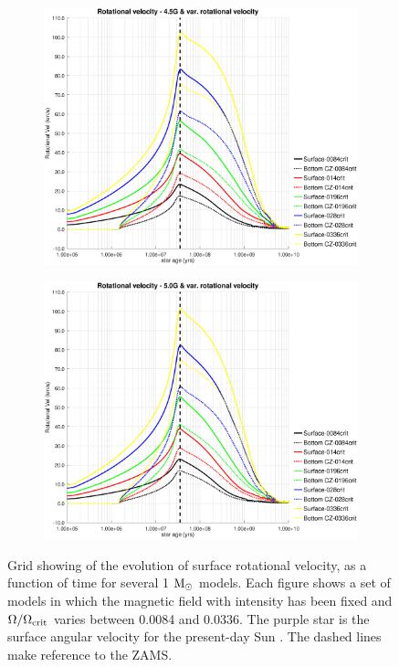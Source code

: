 \documentclass[fleqn,usenatbib]{mnras}
\begin{document}
\begin{figure}
\begin{subfigure}[h]{0.47\textwidth}
    \includegraphics[trim = 30mm 15mm 20mm 15mm, clip,width=\textwidth]{figures/rot_vel_var_vel_4_5g.eps}
    \label{fig:subim45}
    \end{subfigure}
    \begin{subfigure}[h]{0.47\textwidth}
    \includegraphics[trim = 30mm 15mm 20mm 15mm, clip,width=\textwidth]{figures/rot_vel_var_vel_5_0g.eps}
    \label{fig:subim46}
    \end{subfigure}
\caption{Grid showing of the evolution of surface rotational velocity, as a function of time for several 1 $\mathrm{M}_\odot$ models. Each figure shows a set of models in which the magnetic field with intensity has been fixed and $\Omega / \Omega_{\mathrm{crit}}$ varies between 0.0084 and 0.0336. The purple star is the surface angular velocity for the present-day Sun \citep{Gill2012}. The dashed lines make reference to the ZAMS.}
\label{fig:grid_rot_vel}
\end{figure}




\bsp	%
\label{lastpage}
\end{document}

